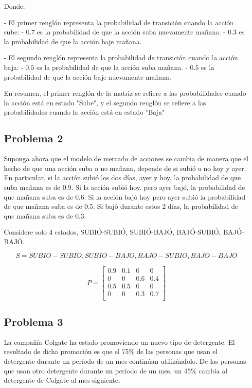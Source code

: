 \documentclass{article}
\begin{document}
Donde:

- El primer renglón representa la probabilidad de transición cuando la acción sube:
- $0.7$ es la probabilidad de que la acción suba nuevamente mañana.
- $0.3$ es la probabilidad de que la acción baje mañana.

- El segundo renglón representa la probabilidad de transición cuando la acción baja:
- $0.5$ es la probabilidad de que la acción suba mañana.
- $0.5$ es la probabilidad de que la acción baje nuevamente mañana.

En resumen, el primer renglón de la matriz se refiere a las probabilidades cuando la acción está en estado "Sube", y el segundo renglón se refiere a las probabilidades cuando la acción está en estado "Baja"

\subsection*{Problema 2}

Suponga ahora que el modelo de mercado de acciones se cambia de manera que el hecho de que una acción suba o no mañana, depende de si subió o no hoy y ayer. En particular, si la acción subió los dos días, ayer y hoy, la probabilidad de que suba mañana es de 0.9. Si la acción subió hoy, pero ayer bajó, la probabilidad de que mañana suba es de 0.6. Si la acción bajó hoy pero ayer subió la probabilidad de que mañana suba es de 0.5. Si bajó durante estos 2 días, la probabilidad de que mañana suba es de 0.3.

Considere solo 4 estados, SUBIÓ-SUBIÓ, SUBIÓ-BAJÓ, BAJÓ-SUBIÓ, BAJÓ-BAJÓ.

\[S={SUBIO-SUBIO,SUBIO-BAJO,BAJO-SUBIO,BAJO-BAJO}\]

\[
    P = \begin{bmatrix}
        0.9 & 0.1 & 0   & 0   \\
        0   & 0   & 0.6 & 0.4 \\
        0.5 & 0.5 & 0   & 0   \\
        0   & 0   & 0.3 & 0.7 \\
    \end{bmatrix}
\]

\subsection*{Problema 3}

La compañía Colgate ha estado promoviendo un nuevo tipo de detergente. El resultado de dicha promoción es que el 75\% de las personas que usan el detergente durante un período de un mes continúan utilizándolo. De las personas que usan otro detergente durante un período de un mes, un 45\% cambia al detergente de Colgate al mes siguiente.
\end{document}
